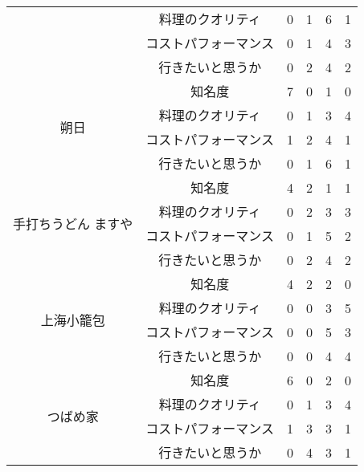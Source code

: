\begin{table}[H]
{\begin{tabular}{|c|c|r|r|r|r|}
 & 料理のクオリティ & 0 & 1 & 6 & 1 \\ \cline{2-6}
 & コストパフォーマンス & 0 & 1 & 4 & 3 \\ \cline{2-6}
 & 行きたいと思うか & 0 & 2 & 4 & 2 \\ \hline
\multirow{4}{*}{朔日} & 知名度 & 7 & 0 & 1 & 0 \\ \cline{2-6}
 & 料理のクオリティ & 0 & 1 & 3 & 4 \\ \cline{2-6}
 & コストパフォーマンス & 1 & 2 & 4 & 1 \\ \cline{2-6}
 & 行きたいと思うか & 0 & 1 & 6 & 1 \\ \hline
\multirow{4}{*}{手打ちうどん ますや} & 知名度 & 4 & 2 & 1 & 1 \\ \cline{2-6}
 & 料理のクオリティ & 0 & 2 & 3 & 3 \\ \cline{2-6}
 & コストパフォーマンス & 0 & 1 & 5 & 2 \\ \cline{2-6}
 & 行きたいと思うか & 0 & 2 & 4 & 2 \\ \hline
\multirow{4}{*}{上海小籠包} & 知名度 & 4 & 2 & 2 & 0 \\ \cline{2-6}
 & 料理のクオリティ & 0 & 0 & 3 & 5 \\ \cline{2-6}
 & コストパフォーマンス & 0 & 0 & 5 & 3 \\ \cline{2-6}
 & 行きたいと思うか & 0 & 0 & 4 & 4 \\ \hline
\multirow{4}{*}{つばめ家} & 知名度 & 6 & 0 & 2 & 0 \\ \cline{2-6}
 & 料理のクオリティ & 0 & 1 & 3 & 4 \\ \cline{2-6}
 & コストパフォーマンス & 1 & 3 & 3 & 1 \\ \cline{2-6}
 & 行きたいと思うか & 0 & 4 & 3 & 1 \\ \hline
\end{tabular}
}
\end{table}
